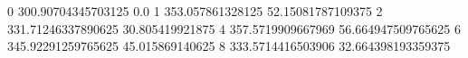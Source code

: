 0 300.90704345703125 0.0
1 353.057861328125 52.15081787109375
2 331.71246337890625 30.805419921875
4 357.5719909667969 56.664947509765625
6 345.92291259765625 45.015869140625
8 333.5714416503906 32.664398193359375
